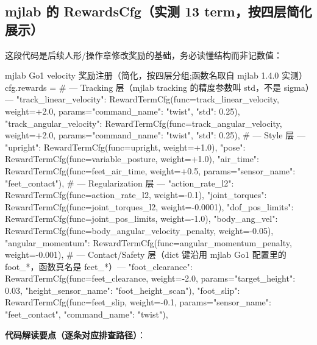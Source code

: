 \subsection{mjlab 的 RewardsCfg（实测 13 term，按四层简化展示）}
\label{sec:rlmc-ql-reward-cfg}

这段代码是后续人形/操作章修改奖励的基础，务必读懂结构而非记数值：

\begin{codebox}[Python]{mjlab Go1 velocity 奖励注册（简化，按四层分组;函数名取自 mjlab 1.4.0 实测）}
cfg.rewards = {
    # --- Tracking 层（mjlab tracking 的精度参数叫 std，不是 sigma）---
    "track_linear_velocity":  RewardTermCfg(func=track_linear_velocity,  weight=+2.0,
                                  params={"command_name": "twist", "std": 0.25}),
    "track_angular_velocity": RewardTermCfg(func=track_angular_velocity, weight=+2.0,
                                  params={"command_name": "twist", "std": 0.25}),
    # --- Style 层 ---
    "upright":          RewardTermCfg(func=upright,           weight=+1.0),
    "pose":             RewardTermCfg(func=variable_posture,  weight=+1.0),
    "air_time":         RewardTermCfg(func=feet_air_time,     weight=+0.5,
                            params={"sensor_name": "feet_contact"}),
    # --- Regularization 层 ---
    "action_rate_l2":   RewardTermCfg(func=action_rate_l2,            weight=-0.1),
    "joint_torques":    RewardTermCfg(func=joint_torques_l2,          weight=-0.0001),
    "dof_pos_limits":   RewardTermCfg(func=joint_pos_limits,          weight=-1.0),
    "body_ang_vel":     RewardTermCfg(func=body_angular_velocity_penalty, weight=-0.05),
    "angular_momentum": RewardTermCfg(func=angular_momentum_penalty,  weight=-0.001),
    # --- Contact/Safety 层（dict 键沿用 mjlab Go1 配置里的 foot_*，函数真名是 feet_*）---
    "foot_clearance": RewardTermCfg(func=feet_clearance, weight=-2.0,
                          params={"target_height": 0.03, "height_sensor_name": "foot_height_scan"}),
    "foot_slip":      RewardTermCfg(func=feet_slip, weight=-0.1,
                          params={"sensor_name": "feet_contact", "command_name": "twist"}),
}
\end{codebox}

\textbf{代码解读要点（逐条对应排查路径）}：

